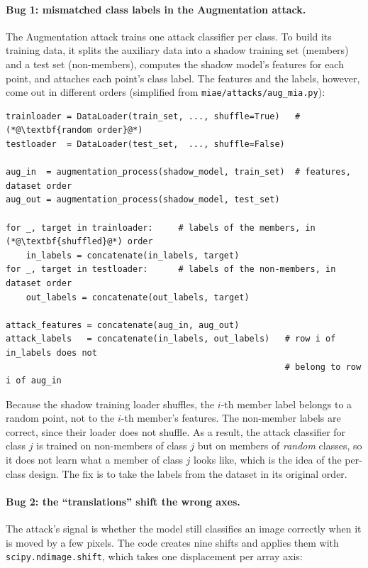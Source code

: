 \documentclass[a4paper]{article}
\begin{document}
\paragraph{Bug 1: mismatched class labels in the Augmentation attack.}
The Augmentation attack \citep{choquette2021label} trains one attack classifier per class.
To build its training data, it splits the auxiliary data into a shadow training set (members) and a test set (non-members), computes the shadow model's features for each point, and attaches each point's class label.
The features and the labels, however, come out in different orders (simplified from \texttt{miae/attacks/aug\_mia.py}):

\begin{lstlisting}
trainloader = DataLoader(train_set, ..., shuffle=True)   # (*@\textbf{random order}@*)
testloader  = DataLoader(test_set,  ..., shuffle=False)

aug_in  = augmentation_process(shadow_model, train_set)  # features, dataset order
aug_out = augmentation_process(shadow_model, test_set)

for _, target in trainloader:     # labels of the members, in (*@\textbf{shuffled}@*) order
    in_labels = concatenate(in_labels, target)
for _, target in testloader:      # labels of the non-members, in dataset order
    out_labels = concatenate(out_labels, target)

attack_features = concatenate(aug_in, aug_out)
attack_labels   = concatenate(in_labels, out_labels)   # row i of in_labels does not
                                                       # belong to row i of aug_in
\end{lstlisting}

Because the shadow training loader shuffles, the $i$-th member label belongs to a random point, not to the $i$-th member's features.
The non-member labels are correct, since their loader does not shuffle.
As a result, the attack classifier for class $j$ is trained on non-members of class $j$ but on members of \emph{random} classes, so it does not learn what a member of class $j$ looks like, which is the idea of the per-class design.
The fix is to take the labels from the dataset in its original order.

\paragraph{Bug 2: the ``translations'' shift the wrong axes.}
The attack's signal is whether the model still classifies an image correctly when it is moved by a few pixels.
The code creates nine shifts and applies them with \texttt{scipy.ndimage.shift}, which takes one displacement per array axis:
\end{document}
